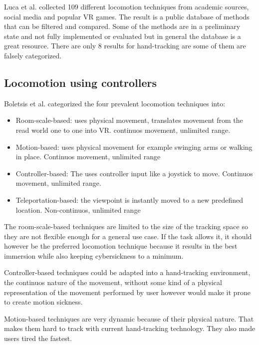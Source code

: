 Luca et al. \cite{Luca} collected 109 different locomotion techniques from academic
sources, social media and popular VR games. The result is a public
database of methods that can be filtered and compared. Some of the
methods are in a preliminary state and not fully implemented or
evaluated but in general the database is a great resource. There are only 8 results for hand-tracking
are some of them are falsely categorized.

\subsection{Locomotion using controllers}\label{locomotion-using-controllers}

Boletsis et al. \cite{Boletsis} categorized the four
prevalent locomotion techniques into:

\begin{itemize}
\itemsep1pt\parskip0pt
\item
  Room-scale-based: uses physical movement, translates movement from the
  read world one to one into VR. continuos movement, unlimited range.\\
\item
  Motion-based: uses physical movement for example swinging arms or
  walking in place. Continuos movement, unlimited range\\
\item
  Controller-based: The uses controller input like a joystick to move.
  Continuos movement, unlimited range.\\
\item
  Teleportation-based: the viewpoint is instantly moved to a new
  predefined location. Non-continuos, unlimited range
\end{itemize}

The room-scale-based techniques are limited to the size of the tracking
space so they are not flexible enough for a general use case. If the
task allows it, it should however be the preferred locomotion technique
because it results in the best immersion while also keeping
cybersickness to a minimum.

Controller-based techniques could be adapted into a hand-tracking
environment, the continuos nature of the movement, without some kind of
a physical representation of the movement performed by user however
would make it prone to create motion sickness.

Motion-based techniques are very dynamic because of their physical
nature. That makes them hard to track with current hand-tracking
technology. They also made users tired the fastest.
\cite{Boletsis}


